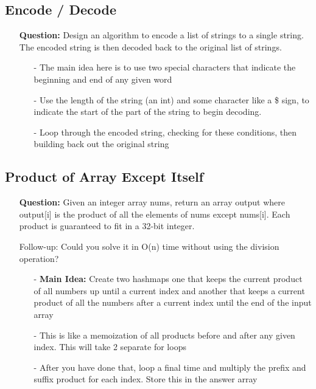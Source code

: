 \documentclass[12pt]{article}
\begin{document}
\subsection{Encode / Decode}
\begin{enumerate}
  \item[] \textbf{Question:} Design an algorithm to encode a list of strings to a single string. The encoded string is then decoded back to the original list of strings. 

    \begin{enumerate}
      \item[-] The main idea here is to use two special characters that indicate the beginning and end of any given word  
      \item[-] Use the length of the string (an int) and some character like a \$ sign, to indicate the start of the part of the string to begin decoding. 
      \item[-] Loop through the encoded string, checking for these conditions, then building back out the original string
    \end{enumerate}
\end{enumerate}

\subsection{Product of Array Except Itself}
\begin{enumerate}
  \item[] \textbf{Question:} Given an integer array nums, return an array output where output[i] is the product of all the elements of nums except nums[i]. Each product is guaranteed to fit in a 32-bit integer.

Follow-up: Could you solve it in O(n) time without using the division operation?

    \begin{enumerate}
      \item[-] \textbf{Main Idea: } Create two hashmaps one that keeps the current product of all numbers up until a current index and another that keeps a current product of all the numbers after a current index until the end of the input array
      \item[-] This is like a memoization of all products before and after any given index. This will take 2 separate for loops
      \item[-] After you have done that, loop a final time and multiply the prefix and suffix product for each index. Store this in the answer array
    \end{enumerate}
\end{enumerate}
\end{document}
